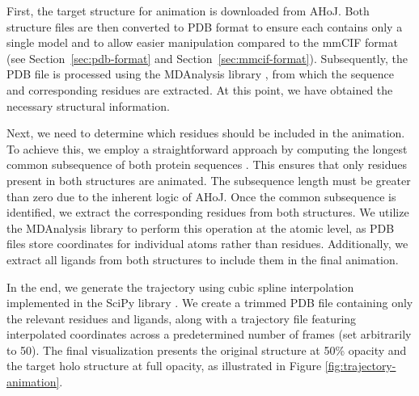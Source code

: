 First, the target structure for animation is downloaded from AHoJ. Both structure files are then converted to PDB format to ensure each contains only a single model and to allow easier manipulation compared to the mmCIF format (see Section~\ref{sec:pdb-format} and Section~\ref{sec:mmcif-format}). Subsequently, the PDB file is processed using the MDAnalysis library \cite{gowers2019mdanalysis}, from which the sequence and corresponding residues are extracted. At this point, we have obtained the necessary structural information.

Next, we need to determine which residues should be included in the animation. To achieve this, we employ a straightforward approach by computing the longest common subsequence of both protein sequences . This ensures that only residues present in both structures are animated. The subsequence length must be greater than zero due to the inherent logic of AHoJ. Once the common subsequence is identified, we extract the corresponding residues from both structures. We utilize the MDAnalysis library to perform this operation at the atomic level, as PDB files store coordinates for individual atoms rather than residues. Additionally, we extract all ligands from both structures to include them in the final animation.

In the end, we generate the trajectory using cubic spline interpolation \cite{mckinley1998cubic} implemented in the SciPy library \cite{virtanen2020scipy}. We create a trimmed PDB file containing only the relevant residues and ligands, along with a trajectory file featuring interpolated coordinates across a predetermined number of frames (set arbitrarily to 50). The final visualization presents the original structure at 50\% opacity and the target holo structure at full opacity, as illustrated in Figure \ref{fig:trajectory-animation}.

